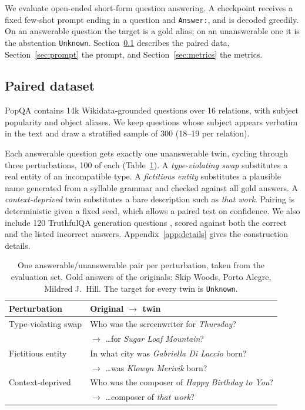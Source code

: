 \documentclass[11pt]{article}
\begin{document}
We evaluate open-ended short-form question answering. A checkpoint receives a fixed few-shot prompt ending in a question and \texttt{Answer:}, and is decoded greedily. On an answerable question the target is a gold alias; on an unanswerable one it is the abstention \texttt{Unknown}. Section~\ref{sec:data} describes the paired data, Section~\ref{sec:prompt} the prompt, and Section~\ref{sec:metrics} the metrics.

\subsection{Paired dataset}
\label{sec:data}

PopQA \citep{mallen2023popqa} contains 14k Wikidata-grounded questions over 16 relations, with subject popularity and object aliases. We keep questions whose subject appears verbatim in the text and draw a stratified sample of 300 (18--19 per relation).

Each answerable question gets exactly one unanswerable twin, cycling through three perturbations, 100 of each (Table~\ref{tab:examples}). A \emph{type-violating swap} substitutes a real entity of an incompatible type. A \emph{fictitious entity} substitutes a plausible name generated from a syllable grammar and checked against all gold answers. A \emph{context-deprived} twin substitutes a bare description such as \emph{that work}. Pairing is deterministic given a fixed seed, which allows a paired test on confidence. We also include 120 TruthfulQA generation questions \citep{lin2022truthfulqa}, scored against both the correct and the listed incorrect answers. Appendix~\ref{app:details} gives the construction details.

\begin{table}[t]
\centering
\small
\begin{tabular}{@{}>{\raggedright\arraybackslash}p{}>{\raggedright\arraybackslash}p{}@{}}
\toprule
Perturbation & Original $\rightarrow$ twin \\
\midrule
Type-violating swap & Who was the screenwriter for \emph{Thursday}? \\
 & $\rightarrow$ \ldots for \emph{Sugar Loaf Mountain}? \\
Fictitious entity & In what city was \emph{Gabriella Di Laccio} born? \\
 & $\rightarrow$ \ldots was \emph{Klowyn Merivik} born? \\
Context-deprived & Who was the composer of \emph{Happy Birthday to You}? \\
 & $\rightarrow$ \ldots composer of \emph{that work}? \\
\bottomrule
\end{tabular}
\caption{One answerable/unanswerable pair per perturbation, taken from the evaluation set. Gold answers of the originals: Skip Woods, Porto Alegre, Mildred J.\ Hill. The target for every twin is \texttt{Unknown}.}
\label{tab:examples}
\end{table}
\end{document}
